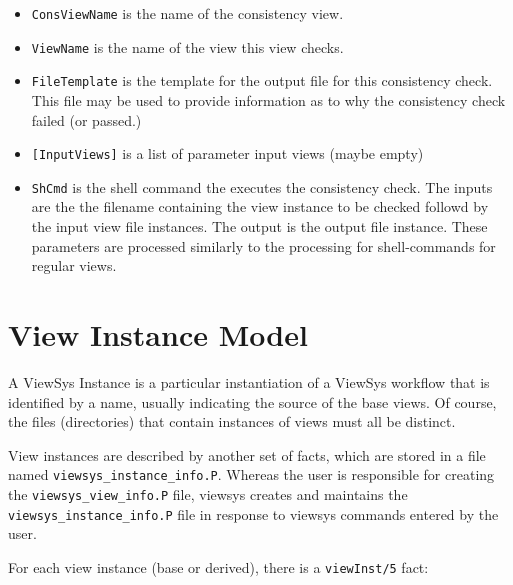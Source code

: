\begin{itemize}
\item {\tt ConsViewName} is the name of the consistency view.

\item {\tt ViewName} is the name of the view this view checks.

\item {\tt FileTemplate} is the template for the output file for this
consistency check.  This file may be used to provide information as to
why the consistency check failed (or passed.)

\item {\tt [InputViews]} is a list of parameter input views (maybe empty)

\item {\tt ShCmd} is the shell command the executes the consistency
check.  The inputs are the the filename containing the view instance
to be checked followd by the input view file instances.  The output is
the output file instance.  These parameters are processed similarly to
the processing for shell-commands for regular views.

\end{itemize}

\section{View Instance Model}

A ViewSys Instance is a particular instantiation of a ViewSys workflow
that is identified by a name, usually indicating the source of the
base views.  Of course, the files (directories) that contain instances
of views must all be distinct.

View instances are described by another set of facts, which are stored
in a file named {\tt viewsys\_instance\_info.P}.  Whereas the user is
responsible for creating the {\tt viewsys\_view\_info.P} file, viewsys
creates and maintains the {\tt viewsys\_instance\_info.P} file in
response to viewsys commands entered by the user.

For each view instance (base or derived), there is a {\tt viewInst/5}
fact:

